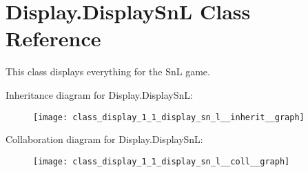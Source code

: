 \hypertarget{class_display_1_1_display_sn_l}{}\section{Display.\+Display\+Sn\+L Class Reference}
\label{class_display_1_1_display_sn_l}


This class displays everything for the Sn\+L game.  




Inheritance diagram for Display.\+Display\+Sn\+L\+:
\nopagebreak
\begin{figure}[H]
\begin{center}
\leavevmode
\texttt{[image: class\_display\_1\_1\_display\_sn\_l\_\_inherit\_\_graph]}
\end{center}
\end{figure}


Collaboration diagram for Display.\+Display\+Sn\+L\+:
\nopagebreak
\begin{figure}[H]
\begin{center}
\leavevmode
\texttt{[image: class\_display\_1\_1\_display\_sn\_l\_\_coll\_\_graph]}
\end{center}
\end{figure}
